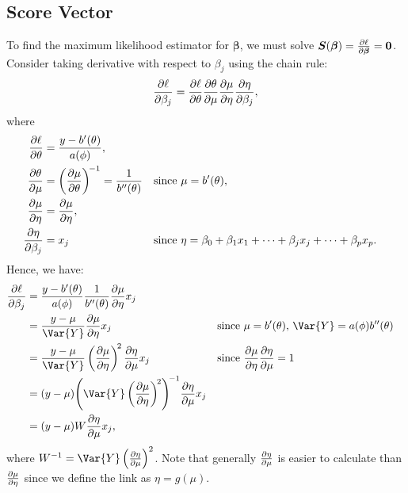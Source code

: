 \documentclass{article}\usepackage[]{graphicx}\usepackage[svgnames]{xcolor}
\providecommand{\Vector}[1]{\bm{#1}}%
\begin{document}
\subsection*{Score Vector}
To find the maximum likelihood estimator for $ \Vector{\beta} $, we must solve $ \Vector{S}(\Vector{\beta})=\pdv{\ell}{\Vector{\beta}}=\Vector{0} $.
Consider taking derivative with respect to $ \beta_j $ using the chain rule:
\[ \pdv{\ell}{\beta_j}=\pdv{\ell}{\theta}\pdv{\theta}{\mu}\pdv{\mu}{\eta}\pdv{\eta}{\beta_j}, \]
where
\begin{align*}
    \pdv{\ell}{\theta}  & =\frac{y-b^{\prime}(\theta)}{a(\phi)},                                                                                                          \\
    \pdv{\theta}{\mu}   & =\pdv{\mu}{\theta}^{\!-1}=\frac{1}{b^{\prime\prime}(\theta)} &  & \text{since $ \mu=b^\prime(\theta) $},                                        \\
    \pdv{\mu}{\eta}     & =\pdv{\mu}{\eta},                                                                                                                               \\
    \pdv{\eta}{\beta_j} & =x_j                                                         &  & \text{since $ \eta=\beta_0+\beta_1x_1+\cdots+\beta_jx_j+\cdots+\beta_px_p $}.
\end{align*}
Hence, we have:
\begin{align*}
    \pdv{\ell}{\beta_j}
     & =\frac{y-b^{\prime}(\theta)}{a(\phi)}\frac{1}{b^{\prime\prime}(\theta)}\pdv{\mu}{\eta}x_j                                                                                           \\
     & =\frac{y-\mu}{\Var{Y}}\pdv{\mu}{\eta}x_j                                                  &  & \text{since $ \mu=b^{\prime}(\theta) $, $ \Var{Y}=a(\phi)b^{\prime\prime}(\theta) $} \\
     & =\frac{y-\mu}{\Var{Y}}\pdv{\mu}{\eta}^{\!2}\pdv{\eta}{\mu}x_j                             &  & \text{since $ \pdv{\mu}{\eta}\pdv{\eta}{\mu}=1 $}                                    \\
     & =(y-\mu)\Biggl(\Var{Y}\pdv{\mu}{\eta}^{\!2}\Biggr)^{\!-1}\pdv{\eta}{\mu}x_j                                                                                                         \\
     & =(y-\mu)W\pdv{\eta}{\mu}x_j,
\end{align*}
where $ W^{-1}=\Var{Y}\pdv{\eta}{\mu}^2 $. Note that generally $ \pdv{\eta}{\mu} $ is easier to calculate
than $ \pdv{\mu}{\eta} $ since we define the link as $ \eta=g(\mu) $.
\end{document}
